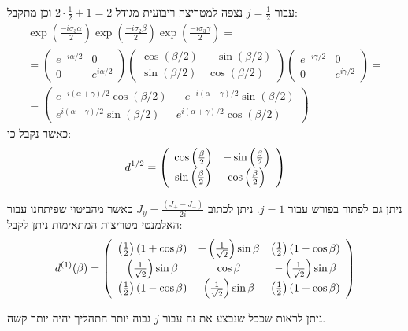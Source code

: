 \documentclass{tstextbook}
\begin{document}
\begin{example}
עבור \(j=\frac{1}{2}\) נצפה למטריצה ריבועית מגודל \(2\cdot \frac{1}{2}+1=2\) וכן מתקבל:
$$\begin{gather}\exp\left(\frac{-i\sigma_{3}\alpha}{2}\right)\exp\left(\frac{-i\sigma_{2}\beta}{2}\right)\exp\left(\frac{-i\sigma_{3}\gamma}{2}\right)=\\=\begin{pmatrix}e^{-i\alpha/2}&0\\ 0&e^{i\alpha/2}\end{pmatrix}\begin{pmatrix}\cos\left( \beta/2 \right)&-\sin\left( \beta/2 \right)\\ \sin\left( \beta/2 \right)&\cos\left( \beta/2 \right)\end{pmatrix}\begin{pmatrix}e^{-i\gamma/2}&0\\ 0&e^{i\gamma/2}\end{pmatrix}=\\=\begin{pmatrix}e^{-i\left( \alpha+\gamma \right)/2}\cos\left( \beta/2 \right)&-e^{-i\left( \alpha-\gamma \right)/2}\sin\left( \beta/2 \right)\\ e^{i\left( \alpha-\gamma \right)/2}\sin\left( \beta/2 \right)&e^{i\left( \alpha+\gamma \right)/2}\cos\left( \beta/2 \right)\end{pmatrix} 
\end{gather}$$
כאשר נקבל כי:
$$d^{1/2}=\left(\begin{array}{c c}{{\cos\left(\frac{\beta}{2}\right)}}&{{-\sin\left(\frac{\beta}{2}\right)}}\\ {{\sin\left(\frac{\beta}{2}\right)}}&{{\cos\left(\frac{\beta}{2}\right)}}\end{array}\right)$$

\end{example}
\begin{example}
ניתן גם לפתור בפורש עבור \(j=1\). ניתן לכתוב \(J_{y}=\frac{(J_{+}-J_{-})}{2i}\) כאשר מהביטוי שפיתחנו עבור האלמנטי מטריצות המתאימות ניתן לקבל:
$$d^{(1)}(\beta)=\left(\begin{array}{c c c}{{\left(\frac{1}{2}\right)\left(1+\cos\beta\right)}}&{{-\left(\frac{1}{\sqrt{2}}\right)\sin\beta}}&{{\left(\frac{1}{2}\right)\left(1-\cos\beta\right)}}\\  {{\left(\frac{1}{\sqrt{2}}\right)\sin\beta}}&{{\cos\beta}}&{{-\left(\frac{1}{\sqrt{2}}\right)\sin\beta}}\\ {{\left(\frac{1}{2}\right)\left(1-\cos\beta\right)}}&{{\left(\frac{1}{\sqrt{2}}\right)\sin\beta}}&{{\left(\frac{1}{2}\right)\left(1+\cos\beta\right)}}\end{array}\right)$$

\end{example}
ניתן לראות שככל שנבצע את זה עבור \(j\) גבוה יותר התהליך יהיה יותר קשה.
\end{document}
